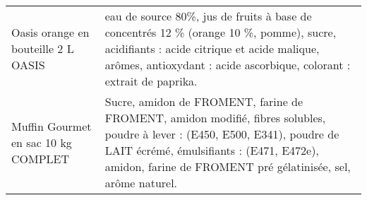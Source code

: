 \begin{longtable}{p{5cm}p{10cm}}
                                                                      Oasis orange en bouteille 2 L OASIS &                                                                                                                                                                                                                                                                                                                                                                                                                                                                                                                                                                                                                                                                                                                                                                                                                           eau de source 80\%, jus de fruits à base de concentrés 12 \% (orange 10 \%, pomme), sucre, acidifiants : acide citrique et acide malique, arômes, antioxydant : acide  ascorbique, colorant : extrait de paprika. \\
                                                                      Muffin Gourmet en sac 10 kg COMPLET &                                                                                                                                                                                                                                                                                                                                                                                                                                                                                                                                                                                                                                                                                                                                                                                                  Sucre, amidon de FROMENT, farine de FROMENT, amidon modifié, fibres solubles, poudre à lever : (E450, E500, E341), poudre de LAIT écrémé, émulsifiants : (E471, E472e),  amidon, farine de FROMENT pré gélatinisée, sel, arôme naturel. \\

\end{longtable}
